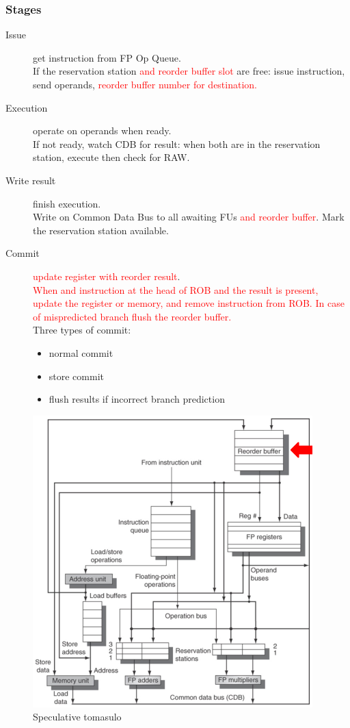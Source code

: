 \subsubsection{Stages}
\begin{description}
    \item[Issue] get instruction from FP Op Queue.\\
    If the reservation station \textcolor{red}{and reorder buffer slot} are free: issue instruction, send
    operands, \textcolor{red}{reorder buffer number for destination.}
    \item[Execution] operate on operands when ready.\\
    If not ready, watch CDB for result: when both are in the reservation station, execute then check for RAW.
    \item[Write result] finish execution.\\
    Write on Common Data Bus to all awaiting FUs \textcolor{red}{and reorder buffer}.
    Mark the reservation station available.
    \item[Commit] \textcolor{red}{update register with reorder result}.\\
    \textcolor{red}{When and instruction at the head of ROB and the result is present, update the register or memory,
        and remove instruction from ROB. In case of mispredicted branch flush the reorder buffer.}\\
    Three types of commit:
    \begin{itemize}[noitemsep]
        \item normal commit
        \item store commit
        \item flush results if incorrect branch prediction
    \end{itemize}
\end{description}

\begin{figure}
    \centering
    \includegraphics[scale = 0.5]{images/speculative-tomasulo}
    \caption{Speculative tomasulo}
    \label{fig:speculative-tomasulo}
\end{figure}

